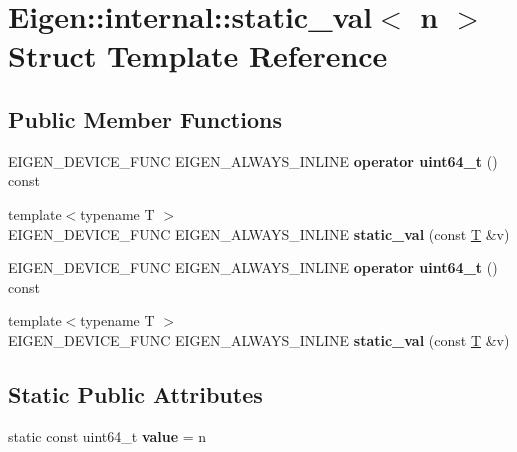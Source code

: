 \hypertarget{struct_eigen_1_1internal_1_1static__val}{}\section{Eigen\+:\+:internal\+:\+:static\+\_\+val$<$ n $>$ Struct Template Reference}
\label{struct_eigen_1_1internal_1_1static__val}
\subsection*{Public Member Functions}
\begin{DoxyCompactItemize}
\item 
\mbox{\label{struct_eigen_1_1internal_1_1static__val_a41b51a4208d9af9f18004bf8e6fbf715}} 
E\+I\+G\+E\+N\+\_\+\+D\+E\+V\+I\+C\+E\+\_\+\+F\+U\+NC E\+I\+G\+E\+N\+\_\+\+A\+L\+W\+A\+Y\+S\+\_\+\+I\+N\+L\+I\+NE {\bfseries operator uint64\+\_\+t} () const
\item 
\mbox{\label{struct_eigen_1_1internal_1_1static__val_a00abe4cadf07ddae5c0d3fd0761578b7}} 
{\footnotesize template$<$typename T $>$ }\\E\+I\+G\+E\+N\+\_\+\+D\+E\+V\+I\+C\+E\+\_\+\+F\+U\+NC E\+I\+G\+E\+N\+\_\+\+A\+L\+W\+A\+Y\+S\+\_\+\+I\+N\+L\+I\+NE {\bfseries static\+\_\+val} (const \hyperlink{group___sparse_core___module}{T} \&v)
\item 
\mbox{\label{struct_eigen_1_1internal_1_1static__val_a41b51a4208d9af9f18004bf8e6fbf715}} 
E\+I\+G\+E\+N\+\_\+\+D\+E\+V\+I\+C\+E\+\_\+\+F\+U\+NC E\+I\+G\+E\+N\+\_\+\+A\+L\+W\+A\+Y\+S\+\_\+\+I\+N\+L\+I\+NE {\bfseries operator uint64\+\_\+t} () const
\item 
\mbox{\label{struct_eigen_1_1internal_1_1static__val_a00abe4cadf07ddae5c0d3fd0761578b7}} 
{\footnotesize template$<$typename T $>$ }\\E\+I\+G\+E\+N\+\_\+\+D\+E\+V\+I\+C\+E\+\_\+\+F\+U\+NC E\+I\+G\+E\+N\+\_\+\+A\+L\+W\+A\+Y\+S\+\_\+\+I\+N\+L\+I\+NE {\bfseries static\+\_\+val} (const \hyperlink{group___sparse_core___module}{T} \&v)
\end{DoxyCompactItemize}
\subsection*{Static Public Attributes}
\begin{DoxyCompactItemize}
\item 
\mbox{\label{struct_eigen_1_1internal_1_1static__val_a790f906658404acdedce950255f8cc1c}} 
static const uint64\+\_\+t {\bfseries value} = n
\end{DoxyCompactItemize}


